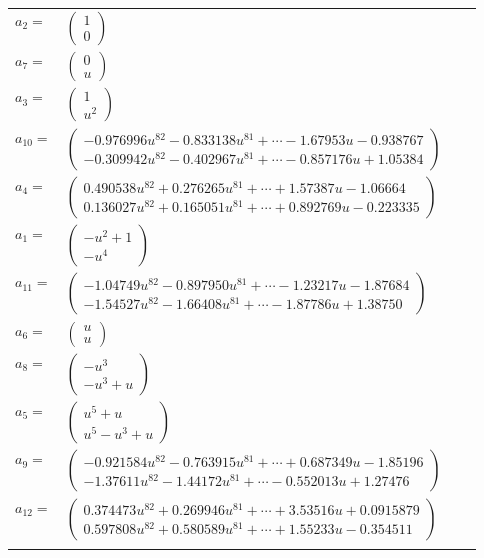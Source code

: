 \documentclass[1p]{elsarticle_modified}
\theoremstyle{definition}
\begin{document}
\begin{tabular}{m{7pt} m{180pt} m{7pt} m{180pt} }
\flushright $a_{2}=$&$\begin{pmatrix}1\\0\end{pmatrix}$ \\
\flushright $a_{7}=$&$\begin{pmatrix}0\\u\end{pmatrix}$ \\
\flushright $a_{3}=$&$\begin{pmatrix}1\\u^2\end{pmatrix}$ \\
\flushright $a_{10}=$&$\begin{pmatrix}-0.976996 u^{82}-0.833138 u^{81}+\cdots-1.67953 u-0.938767\\-0.309942 u^{82}-0.402967 u^{81}+\cdots-0.857176 u+1.05384\end{pmatrix}$ \\
\flushright $a_{4}=$&$\begin{pmatrix}0.490538 u^{82}+0.276265 u^{81}+\cdots+1.57387 u-1.06664\\0.136027 u^{82}+0.165051 u^{81}+\cdots+0.892769 u-0.223335\end{pmatrix}$ \\
\flushright $a_{1}=$&$\begin{pmatrix}- u^2+1\\- u^4\end{pmatrix}$ \\
\flushright $a_{11}=$&$\begin{pmatrix}-1.04749 u^{82}-0.897950 u^{81}+\cdots-1.23217 u-1.87684\\-1.54527 u^{82}-1.66408 u^{81}+\cdots-1.87786 u+1.38750\end{pmatrix}$ \\
\flushright $a_{6}=$&$\begin{pmatrix}u\\u\end{pmatrix}$ \\
\flushright $a_{8}=$&$\begin{pmatrix}- u^3\\- u^3+u\end{pmatrix}$ \\
\flushright $a_{5}=$&$\begin{pmatrix}u^5+u\\u^5- u^3+u\end{pmatrix}$ \\
\flushright $a_{9}=$&$\begin{pmatrix}-0.921584 u^{82}-0.763915 u^{81}+\cdots+0.687349 u-1.85196\\-1.37611 u^{82}-1.44172 u^{81}+\cdots-0.552013 u+1.27476\end{pmatrix}$ \\
\flushright $a_{12}=$&$\begin{pmatrix}0.374473 u^{82}+0.269946 u^{81}+\cdots+3.53516 u+0.0915879\\0.597808 u^{82}+0.580589 u^{81}+\cdots+1.55233 u-0.354511\end{pmatrix}$\\&\end{tabular}
\end{document}
